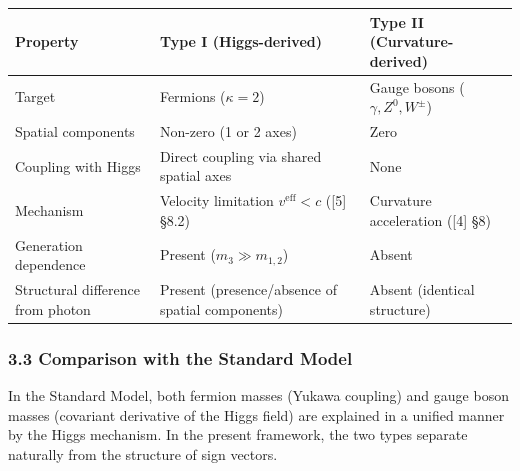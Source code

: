 \documentclass[
  a4paper,11pt]{article}
\newcounter{none}
\theoremstyle{definition}
\theoremstyle{remark}
\begin{document}
{\def\LTcaptype{none} %
\begin{longtable}[]{@{}
  >{\raggedright\arraybackslash}p{}
  >{\raggedright\arraybackslash}p{}
  >{\raggedright\arraybackslash}p{}@{}}
\toprule\noalign{}
\begin{minipage}[b]{\linewidth}\raggedright
Property
\end{minipage} & \begin{minipage}[b]{\linewidth}\raggedright
Type I (Higgs-derived)
\end{minipage} & \begin{minipage}[b]{\linewidth}\raggedright
Type II (Curvature-derived)
\end{minipage} \\
\midrule\noalign{}
\endhead
\bottomrule\noalign{}
\endlastfoot
Target & Fermions (\(\kappa = 2\)) & Gauge bosons
(\(\gamma, Z^0, W^{\pm}\)) \\
Spatial components & Non-zero (1 or 2 axes) & Zero \\
Coupling with Higgs & Direct coupling via shared spatial axes & None \\
Mechanism & Velocity limitation \(v^{\text{eff}} < c\) ({[}5{]} §8.2) &
Curvature acceleration ({[}4{]} §8) \\
Generation dependence & Present (\(m_3 \gg m_{1,2}\)) & Absent \\
Structural difference from photon & Present (presence/absence of spatial
components) & Absent (identical structure) \\
\end{longtable}
}

\subsubsection{3.3 Comparison with the Standard
Model}\label{comparison-with-the-standard-model}

In the Standard Model, both fermion masses (Yukawa coupling) and gauge
boson masses (covariant derivative of the Higgs field) are explained in
a unified manner by the Higgs mechanism. In the present framework, the
two types separate naturally from the structure of sign vectors.
\end{document}
